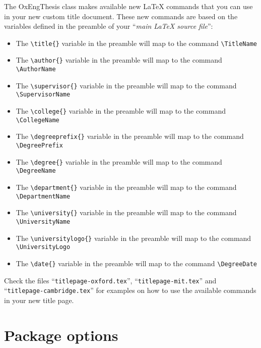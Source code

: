 The OxEngThesis class makes available new LaTeX commands that you can use in your new custom title document. These new commands are based on the variables defined in the preamble of your ``\textit{main LaTeX source file}'':

\begin{itemize}

    \item The \verb|\title{}| variable in the preamble will map to the command \verb|\TitleName|

    \item The \verb|\author{}| variable in the preamble will map to the command \verb|\AuthorName|

    \item The \verb|\supervisor{}| variable in the preamble will map to the command \verb|\SupervisorName|

    \item The \verb|\college{}| variable in the preamble will map to the command \verb|\CollegeName|

    \item The \verb|\degreeprefix{}| variable in the preamble will map to the command \verb|\DegreePrefix|

    \item The \verb|\degree{}| variable in the preamble will map to the command \verb|\DegreeName|

    \item The \verb|\department{}| variable in the preamble will map to the command \verb|\DepartmentName|

    \item The \verb|\university{}| variable in the preamble will map to the command \verb|\UniversityName|

    \item The \verb|\universitylogo{}| variable in the preamble will map to the command \verb|\UniversityLogo|

    \item The \verb|\date{}| variable in the preamble will map to the command \verb|\DegreeDate|

\end{itemize}


Check the files ``\verb|titlepage-oxford.tex|'', ``\verb|titlepage-mit.tex|'' and ``\verb|titlepage-cambridge.tex|'' for examples on how to use the available commands in your new title page.


\section{Package options}


